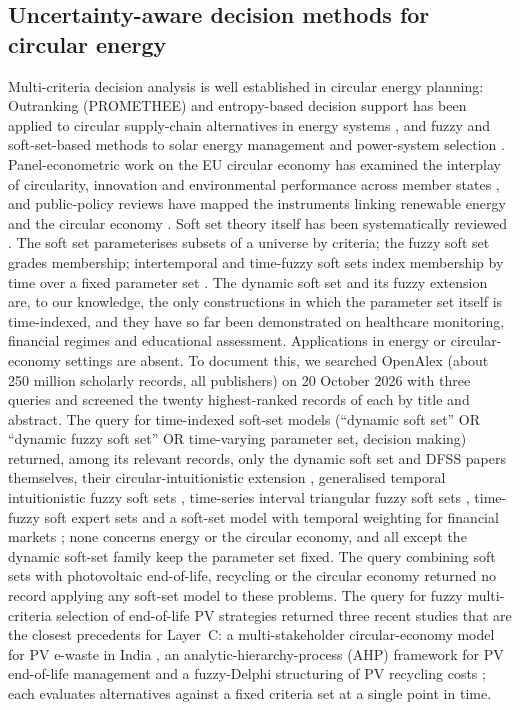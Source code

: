 \documentclass[a4paper,fleqn]{cas-sc}
\begin{document}
\subsection{Uncertainty-aware decision methods for circular energy}
Multi-criteria decision analysis is well established in circular energy planning: Outranking (PROMETHEE) and entropy-based decision support has been applied to circular supply-chain alternatives in energy systems \citep{nguyen2024}, and fuzzy and soft-set-based methods to solar energy management and power-system selection \citep{ashraf2025,zeb2024}. Panel-econometric work on the EU circular economy has examined the interplay of circularity, innovation and environmental performance across member states \citep{fortea2026,kostakis2022}, and public-policy reviews have mapped the instruments linking renewable energy and the circular economy \citep{nunes2023}. Soft set theory itself has been systematically reviewed \citep{alcantud2024review,fujita2026survey}. The soft set \citep{molodtsov1999} parameterises subsets of a universe by criteria; the fuzzy soft set \citep{maji2001fss,cagman2011} grades membership; intertemporal and time-fuzzy soft sets index membership by time over a fixed parameter set \citep{alcantud2018intertemporal,liu2020intertemporal}. The dynamic soft set \citep{saeed2025introduction} and its fuzzy extension \citep{SAEED2026200504} are, to our knowledge, the only constructions in which the parameter set itself is time-indexed, and they have so far been demonstrated on healthcare monitoring, financial regimes and educational assessment. Applications in energy or circular-economy settings are absent. To document this, we searched OpenAlex (about 250 million scholarly records, all publishers) on 20 October 2026 with three queries and screened the twenty highest-ranked records of each by title and abstract. The query for time-indexed soft-set models (``dynamic soft set'' OR ``dynamic fuzzy soft set'' OR time-varying parameter set, decision making) returned, among its relevant records, only the dynamic soft set and DFSS papers themselves, their circular-intuitionistic extension \citep{saeed2026dcifss}, generalised temporal intuitionistic fuzzy soft sets \citep{kamaci2024}, time-series interval triangular fuzzy soft sets \citep{bai2024}, time-fuzzy soft expert sets \citep{odat2025} and a soft-set model with temporal weighting for financial markets \citep{kandemir2026}; none concerns energy or the circular economy, and all except the dynamic soft-set family keep the parameter set fixed. The query combining soft sets with photovoltaic end-of-life, recycling or the circular economy returned no record applying any soft-set model to these problems. The query for fuzzy multi-criteria selection of end-of-life PV strategies returned three recent studies that are the closest precedents for Layer~C: a multi-stakeholder circular-economy model for PV e-waste in India \citep{gautam2024}, an analytic-hierarchy-process (AHP) framework for PV end-of-life management \citep{alzahmi2025} and a fuzzy-Delphi structuring of PV recycling costs \citep{diniz2026}; each evaluates alternatives against a fixed criteria set at a single point in time. 
\end{document}
